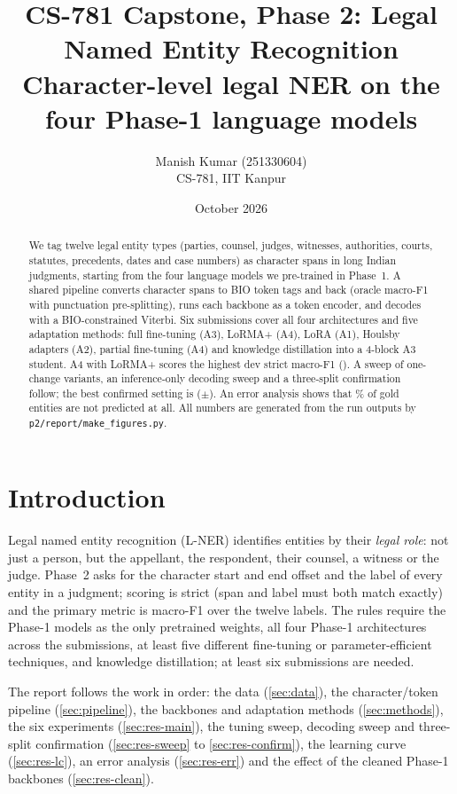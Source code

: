 \documentclass[11pt,a4paper]{article}
\title{\textbf{CS-781 Capstone, Phase 2: Legal Named Entity Recognition}\\[2pt]
\large Character-level legal NER on the four Phase-1 language models}
\author{Manish Kumar (251330604)\\ CS-781, IIT Kanpur}
\date{October 2026}
\newcommand{\code}[1]{\texttt{\small #1}}
\begin{document}
\maketitle

\begin{abstract}
\noindent We tag twelve legal entity types (parties, counsel, judges, witnesses, authorities, courts,
statutes, precedents, dates and case numbers) as character spans in long Indian judgments, starting from the
four language models we pre-trained in Phase~1.  A shared pipeline converts character spans to BIO token tags
and back (oracle macro-F1 \oraclesplit{} with punctuation pre-splitting), runs each backbone as a token
encoder, and decodes with a BIO-constrained Viterbi.  Six submissions cover all four architectures and five
adaptation methods: full fine-tuning (A3), LoRMA+ (A4), LoRA (A1), Houlsby adapters (A2), partial
fine-tuning (A4) and knowledge distillation into a 4-block A3 student.  A4 with LoRMA+ scores the highest
dev strict macro-F1 (\efEtwo).  A sweep of \nsweep{} one-change variants, an inference-only decoding sweep
and a three-split confirmation follow; the best confirmed setting is \bestconfname{}
(\bestconf$\pm$\bestconfsd).  An error analysis shows that \errmissed\% of gold entities are not predicted
at all.  All numbers are generated from the run outputs by \code{p2/report/make\_figures.py}.
\end{abstract}

\tableofcontents
\newpage

\section{Introduction}
Legal named entity recognition (L-NER) identifies entities by their \emph{legal role}: not just a person,
but the appellant, the respondent, their counsel, a witness or the judge.  Phase~2 asks for the character
start and end offset and the label of every entity in a judgment; scoring is strict (span and label must
both match exactly) and the primary metric is macro-F1 over the twelve labels.  The rules require the
Phase-1 models as the only pretrained weights, all four Phase-1 architectures across the submissions, at
least five different fine-tuning or parameter-efficient techniques, and knowledge distillation; at least six
submissions are needed.

The report follows the work in order: the data (\autoref{sec:data}), the character/token pipeline
(\autoref{sec:pipeline}), the backbones and adaptation methods (\autoref{sec:methods}), the six experiments
(\autoref{sec:res-main}), the tuning sweep, decoding sweep and three-split confirmation
(\autoref{sec:res-sweep} to \autoref{sec:res-confirm}), the learning curve (\autoref{sec:res-lc}), an error
analysis (\autoref{sec:res-err}) and the effect of the cleaned Phase-1 backbones (\autoref{sec:res-clean}).
\end{document}
